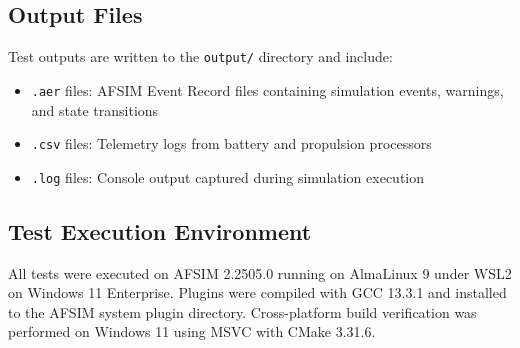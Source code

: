 \documentclass[11pt, letterpaper]{article}
\begin{document}
\subsection{\unclass Output Files}

\unclass Test outputs are written to the \texttt{output/} directory and include:
\begin{itemize}
    \item \unclass \texttt{.aer} files: AFSIM Event Record files containing simulation events, warnings, and state transitions
    \item \unclass \texttt{.csv} files: Telemetry logs from battery and propulsion processors
    \item \unclass \texttt{.log} files: Console output captured during simulation execution
\end{itemize}

\subsection{\unclass Test Execution Environment}

\unclass All tests were executed on AFSIM 2.2505.0 running on AlmaLinux 9 under WSL2 on Windows 11 Enterprise. Plugins were compiled with GCC 13.3.1 and installed to the AFSIM system plugin directory. Cross-platform build verification was performed on Windows 11 using MSVC with CMake 3.31.6.

\doPrintGloss

\doPrintBib%

\newpage\label{mylastpage}
\end{document}
